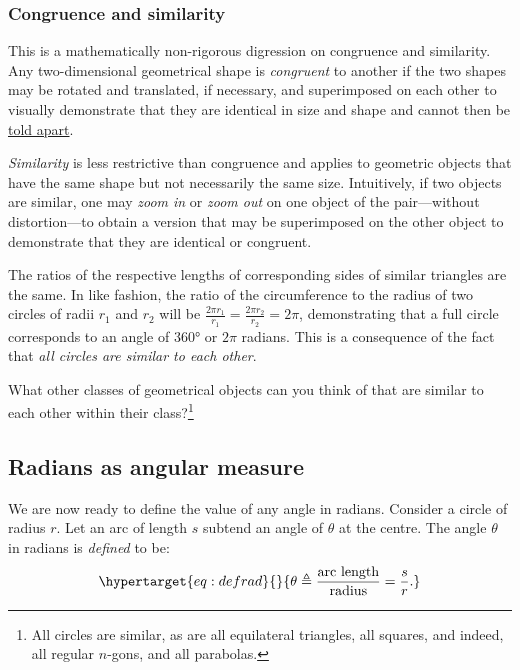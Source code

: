 \documentclass[
  a4paper,
]{article}
\begin{document}
\hypertarget{congruence-and-similarity}{%
\subsubsection{Congruence and
similarity}\label{congruence-and-similarity}}

This is a mathematically non-rigorous digression on congruence and
similarity. Any two-dimensional geometrical shape is \emph{congruent} to
another if the two shapes may be rotated and translated, if necessary,
and superimposed on each other to visually demonstrate that they are
identical in size and shape and cannot then be
\href{https://www.merriam-webster.com/dictionary/tell\%20apart}{told
apart}.

\emph{Similarity} is less restrictive than congruence and applies to
geometric objects that have the same shape but not necessarily the same
size. Intuitively, if two objects are similar, one may \emph{zoom in} or
\emph{zoom out} on one object of the pair---without distortion---to
obtain a version that may be superimposed on the other object to
demonstrate that they are identical or congruent.

The ratios of the respective lengths of corresponding sides of similar
triangles are the same. In like fashion, the ratio of the circumference
to the radius of two circles of radii \(r_1\) and \(r_2\) will be
\(\frac{2\pi r_1}{r_1} =\frac{2\pi r_2}{r_2} = 2\pi\), demonstrating
that a full circle corresponds to an angle of 360° or \(2\pi\) radians.
This is a consequence of the fact that \emph{all circles are similar to
each other}.

What other classes of geometrical objects can you think of that are
similar to each other within their class?\footnote{All circles are
  similar, as are all equilateral triangles, all squares, and indeed,
  all regular \(n\)-gons, and all parabolas.}

\hypertarget{radians-as-angular-measure}{%
\subsection{Radians as angular
measure}\label{radians-as-angular-measure}}

We are now ready to define the value of any angle in radians. Consider a
circle of radius \(r\). Let an arc of length \(s\) subtend an angle of
\(\theta\) at the centre. The angle \(\theta\) in radians is
\emph{defined} to be: \begin{equation}\protect\hypertarget{eq:defrad}{}{
\theta \triangleq \frac{\text{arc length}}{\text{radius}} = \frac{s}{r}.
}\label{eq:defrad}\end{equation}
\end{document}
